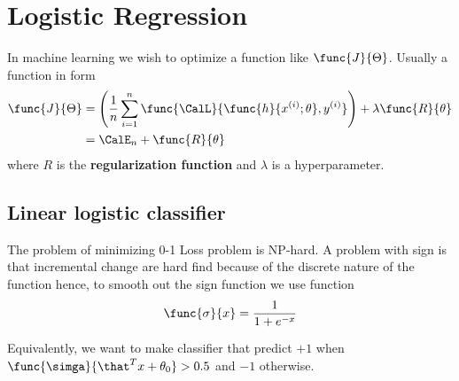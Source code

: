 \chapter{Logistic Regression}
In machine learning we wish to optimize a function like \(\func{J}{\Theta}\). Usually a function in form 
\begin{align*}
    \func{J}{\Theta} &= \left(\dfrac{1}{n} \sum_{i = 1}^n \func{\CalL}{\func{h}{x^{(i)}; \theta} , y^{(i)}} \right) + \lambda \func{R}{\theta} \\
    &= \CalE_n + \func{R}{\theta}
\end{align*}
where \(R\) is the \textbf{regularization function} and \(\lambda\) is a hyperparameter.

\section{Linear logistic classifier}
The problem of minimizing 0-1 Loss problem is NP-hard. A problem with sign is that incremental change are hard find because of the discrete nature of the function hence, to smooth out the sign function we use  function 
\begin{equation*}
    \func{\sigma}{x} = \dfrac{1}{1 + e^{-x}}
\end{equation*}

Equivalently, we want to make classifier that predict \(+1\) when \(\func{\simga}{\that^T x+ \theta_0} > 0.5\) and \(-1\) otherwise.